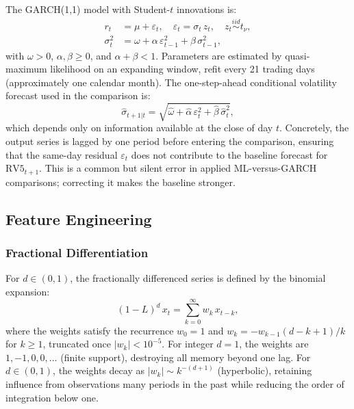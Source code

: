 \documentclass[12pt]{article}
\begin{document}
The GARCH(1,1) model with Student-$t$ innovations is:
\begin{align}
  r_{t} &= \mu + \varepsilon_{t}, \quad
  \varepsilon_{t} = \sigma_{t}\,z_{t}, \quad
  z_{t} \overset{iid}{\sim} t_{\nu}, \label{eq:garch-mean}\\
  \sigma_{t}^{2} &= \omega + \alpha\,\varepsilon_{t-1}^{2}
                   + \beta\,\sigma_{t-1}^{2}, \label{eq:garch-var}
\end{align}
with $\omega > 0$, $\alpha, \beta \geq 0$, and $\alpha + \beta < 1$.
Parameters are estimated by quasi-maximum likelihood on an expanding window,
refit every 21 trading days (approximately one calendar month).  The
one-step-ahead conditional volatility forecast used in the comparison is:
\begin{equation}
  \hat{\sigma}_{t+1|t} = \sqrt{\hat{\omega}
    + \hat{\alpha}\,\varepsilon_{t}^{2}
    + \hat{\beta}\,\hat{\sigma}_{t}^{2}},
  \label{eq:garch-forecast}
\end{equation}
which depends only on information available at the close of day $t$.
Concretely, the output series is lagged by one period before entering the
comparison, ensuring that the same-day residual $\varepsilon_{t}$ does not
contribute to the baseline forecast for $\text{RV5}_{t+1}$.  This is a
common but silent error in applied ML-versus-GARCH comparisons; correcting it
makes the baseline stronger.

\subsection{Feature Engineering}

\subsubsection*{Fractional Differentiation}

For $d \in (0,1)$, the fractionally differenced series is defined by the
binomial expansion:
\begin{equation}
  (1-L)^{d}\,x_{t} = \sum_{k=0}^{\infty} w_{k}\,x_{t-k},
  \label{eq:fracdiff}
\end{equation}
where the weights satisfy the recurrence $w_{0} = 1$ and
$w_{k} = -w_{k-1}(d - k + 1)/k$ for $k \geq 1$, truncated once
$|w_{k}| < 10^{-5}$.  For integer $d = 1$, the weights are $1, -1, 0, 0,
\ldots$ (finite support), destroying all memory beyond one lag.  For
$d \in (0,1)$, the weights decay as $|w_{k}| \sim k^{-(d+1)}$ (hyperbolic),
retaining influence from observations many periods in the past while reducing
the order of integration below one.
\end{document}
